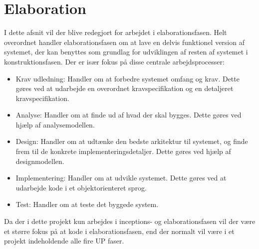 \documentclass[../main.tex]{subfiles}
\begin{document}
\section{Elaboration}
I dette afsnit vil der blive redegjort for arbejdet i elaborationsfasen. Helt overordnet handler elaborationsfasen om at lave en delvis funktionel version af systemet, der kan benyttes som grundlag for udviklingen af resten af systemet i konstruktionsfasen. Der er især fokus på disse centrale arbejdsprocesser:

\begin{itemize}
  \item Krav udledning: Handler om at forbedre systemet omfang og krav. Dette gøres ved at udarbejde en overordnet kravspecifikation og en detaljeret kravspecifikation.
  \item Analyse: Handler om at finde ud af hvad der skal bygges. Dette gøres ved hjælp af analysemodellen.
  \item Design: Handler om at udtænke den bedste arkitektur til systemet, og finde frem til de konkrete implementeringsdetaljer. Dette gøres ved hjælp af designmodellen.
  \item Implementering: Handler om at udvikle systemet. Dette gøres ved at udarbejde kode i et objektorienteret sprog.
  \item Test: Handler om at teste det byggede system.
\end{itemize} \cite{arlow2005uml}

Da der i dette projekt kun arbejdes i inceptions- og elaborationsfasen vil der være et større fokus på at kode i elaborationsfasen, end der normalt vil være i et projekt indeholdende alle fire UP faser. 


















\end{document}
